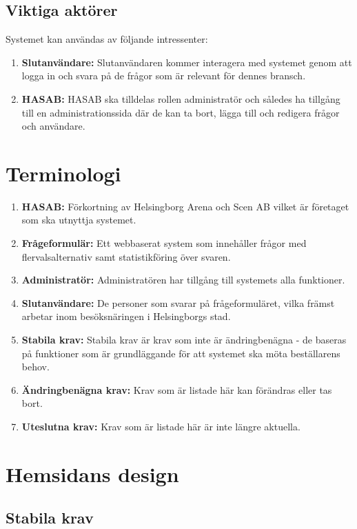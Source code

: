\documentclass{article}
\begin{document}
    \subsection{Viktiga aktörer}
    Systemet kan användas av följande intressenter:
    \begin{enumerate}
        \item \textbf{Slutanvändare:} Slutanvändaren kommer interagera med systemet genom att logga in och svara på de frågor som är relevant för dennes bransch.
        \item \textbf{HASAB:} HASAB ska tilldelas rollen administratör och således ha tillgång till en administrationssida där de kan ta bort, lägga till och redigera frågor och användare.
    \end{enumerate}
    
    \section{Terminologi}
    \begin{enumerate}
        \item \textbf{HASAB:} Förkortning av Helsingborg Arena och Scen AB vilket är företaget som ska utnyttja systemet.
        \item \textbf{Frågeformulär:} Ett webbaserat system som innehåller frågor med flervalsalternativ samt statistikföring över svaren.
        \item \textbf{Administratör:} Administratören har tillgång till systemets alla funktioner.
        \item \textbf{Slutanvändare:}  De personer som svarar på frågeformuläret, vilka främst arbetar inom besöksnäringen i Helsingborgs stad. 
        \item\textbf{Stabila krav:}  Stabila krav är krav som inte är ändringbenägna - de baseras på funktioner som är grundläggande för att systemet ska möta beställarens behov.
        \item \textbf{Ändringbenägna krav:}  Krav som är listade här kan förändras eller tas bort.
        \item \textbf{Uteslutna krav:}  Krav som är listade här är inte längre aktuella.
    \end{enumerate}
    
    \section{Hemsidans design}
    
    \subsection{Stabila krav}
     
\end{document}
